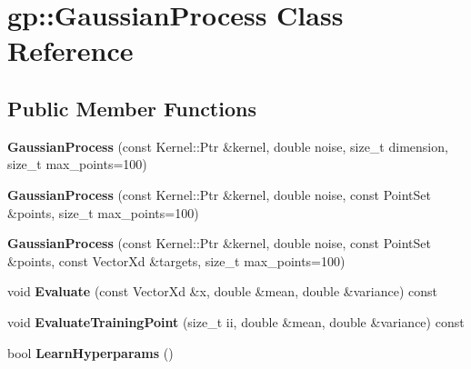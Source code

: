\hypertarget{classgp_1_1_gaussian_process}{}\section{gp\+:\+:Gaussian\+Process Class Reference}
\label{classgp_1_1_gaussian_process}
\subsection*{Public Member Functions}
\begin{DoxyCompactItemize}
\item 
\hypertarget{classgp_1_1_gaussian_process_a47cdf94a91858d0931115260e5e1704c}{}\label{classgp_1_1_gaussian_process_a47cdf94a91858d0931115260e5e1704c} 
{\bfseries Gaussian\+Process} (const Kernel\+::\+Ptr \&kernel, double noise, size\+\_\+t dimension, size\+\_\+t max\+\_\+points=100)
\item 
\hypertarget{classgp_1_1_gaussian_process_a1e5a8059688294936f4396a88082e335}{}\label{classgp_1_1_gaussian_process_a1e5a8059688294936f4396a88082e335} 
{\bfseries Gaussian\+Process} (const Kernel\+::\+Ptr \&kernel, double noise, const Point\+Set \&points, size\+\_\+t max\+\_\+points=100)
\item 
\hypertarget{classgp_1_1_gaussian_process_a3dcd374d4090be21c059ef8ccde1519c}{}\label{classgp_1_1_gaussian_process_a3dcd374d4090be21c059ef8ccde1519c} 
{\bfseries Gaussian\+Process} (const Kernel\+::\+Ptr \&kernel, double noise, const Point\+Set \&points, const Vector\+Xd \&targets, size\+\_\+t max\+\_\+points=100)
\item 
\hypertarget{classgp_1_1_gaussian_process_a850493ba48793ad4bf2e17043d469928}{}\label{classgp_1_1_gaussian_process_a850493ba48793ad4bf2e17043d469928} 
void {\bfseries Evaluate} (const Vector\+Xd \&x, double \&mean, double \&variance) const
\item 
\hypertarget{classgp_1_1_gaussian_process_a2594af50120c38f7c3d4dd894fb07d32}{}\label{classgp_1_1_gaussian_process_a2594af50120c38f7c3d4dd894fb07d32} 
void {\bfseries Evaluate\+Training\+Point} (size\+\_\+t ii, double \&mean, double \&variance) const
\item 
\hypertarget{classgp_1_1_gaussian_process_a8ad3e9ac5a536ed71be83fac8ca4f0af}{}\label{classgp_1_1_gaussian_process_a8ad3e9ac5a536ed71be83fac8ca4f0af} 
bool {\bfseries Learn\+Hyperparams} ()
\item 
\hypertarget{classgp_1_1_gaussian_process_a4f55d908c1033b8d02f986321abc4257}{}\label{classgp_1_1_gaussian_process_a4f55d908c1033b8d02f986321abc4257} 

\end{DoxyCompactItemize}
